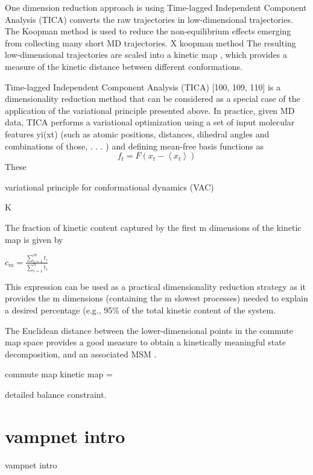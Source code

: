 One dimension reduction approach is using Time-lagged
Independent Component Analysis (TICA) \cite{TICA1-perez2013, TICA2-schwantes2013} converts the raw trajectories in
low-dimensional trajectories. The Koopman method \cite{koopmanold,
koopman2,koopman3,koopman4, wu2017variational, Nueske2017} is used to reduce
the non-equilibrium effects emerging from collecting many short MD trajectories.
X koopman method
 The
resulting low-dimensional trajectories are scaled into a kinetic map
\cite{Noe2015,noe2016commute}, which provides a measure of the kinetic distance
between different conformations. 


Time-lagged Independent Component Analysis (TICA) [100, 109, 110] is a dimensionality
reduction method that can be considered as a special case of the application of the
variational principle presented above. In practice, given MD data, TICA performs a variational
optimization using a set of input molecular features yi(xt) (such as atomic positions,
distances, dihedral angles and combinations of those, . . . ) and defining mean-free basis
functions as
$$f_{t}=F\left(x_{t}-\left\langle x_{t}\right\rangle \right)$$
These

variational principle for conformational dynamics (VAC)


K

The fraction of kinetic content captured by the first m dimensions of the kinetic map is given by \cite{noe2016commute}

$c_{m}=\frac{\sum_{i=1}^{m}t_{i}}{\sum_{i=1}^{n}t_{i}}$

This expression can be used as a practical dimensionality reduction strategy as it provides the m dimensions (containing the m slowest processes) needed to explain a desired percentage (e.g., 95\% of the total kinetic content of the system.

The Euclidean distance between the
lower-dimensional points in the commute map space provides a good measure to
obtain a kinetically meaningful state decomposition, and an associated MSM
\cite{noe2016commute}.

commute map
kinetic map =

detailed balance
constraint. 
\section{vampnet intro}
vampnet intro


